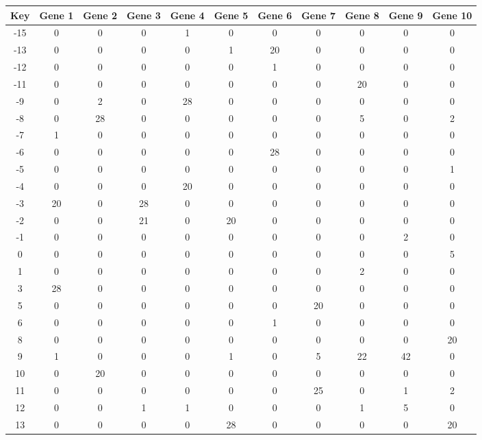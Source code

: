 \begin{tabular}{|c|c|c|c|c|c|c|c|c|c|c|}
\hline
Key & Gene 1 & Gene 2 & Gene 3 & Gene 4 & Gene 5 & Gene 6 & Gene 7 & Gene 8 & Gene 9 & Gene 10 \\
\hline
-15 & 0 & 0 & 0 & 1 & 0 & 0 & 0 & 0 & 0 & 0 \\
-13 & 0 & 0 & 0 & 0 & 1 & 20 & 0 & 0 & 0 & 0 \\
-12 & 0 & 0 & 0 & 0 & 0 & 1 & 0 & 0 & 0 & 0 \\
-11 & 0 & 0 & 0 & 0 & 0 & 0 & 0 & 20 & 0 & 0 \\
-9 & 0 & 2 & 0 & 28 & 0 & 0 & 0 & 0 & 0 & 0 \\
-8 & 0 & 28 & 0 & 0 & 0 & 0 & 0 & 5 & 0 & 2 \\
-7 & 1 & 0 & 0 & 0 & 0 & 0 & 0 & 0 & 0 & 0 \\
-6 & 0 & 0 & 0 & 0 & 0 & 28 & 0 & 0 & 0 & 0 \\
-5 & 0 & 0 & 0 & 0 & 0 & 0 & 0 & 0 & 0 & 1 \\
-4 & 0 & 0 & 0 & 20 & 0 & 0 & 0 & 0 & 0 & 0 \\
-3 & 20 & 0 & 28 & 0 & 0 & 0 & 0 & 0 & 0 & 0 \\
-2 & 0 & 0 & 21 & 0 & 20 & 0 & 0 & 0 & 0 & 0 \\
-1 & 0 & 0 & 0 & 0 & 0 & 0 & 0 & 0 & 2 & 0 \\
0 & 0 & 0 & 0 & 0 & 0 & 0 & 0 & 0 & 0 & 5 \\
1 & 0 & 0 & 0 & 0 & 0 & 0 & 0 & 2 & 0 & 0 \\
3 & 28 & 0 & 0 & 0 & 0 & 0 & 0 & 0 & 0 & 0 \\
5 & 0 & 0 & 0 & 0 & 0 & 0 & 20 & 0 & 0 & 0 \\
6 & 0 & 0 & 0 & 0 & 0 & 1 & 0 & 0 & 0 & 0 \\
8 & 0 & 0 & 0 & 0 & 0 & 0 & 0 & 0 & 0 & 20 \\
9 & 1 & 0 & 0 & 0 & 1 & 0 & 5 & 22 & 42 & 0 \\
10 & 0 & 20 & 0 & 0 & 0 & 0 & 0 & 0 & 0 & 0 \\
11 & 0 & 0 & 0 & 0 & 0 & 0 & 25 & 0 & 1 & 2 \\
12 & 0 & 0 & 1 & 1 & 0 & 0 & 0 & 1 & 5 & 0 \\
13 & 0 & 0 & 0 & 0 & 28 & 0 & 0 & 0 & 0 & 20 \\
\hline
\end{tabular}